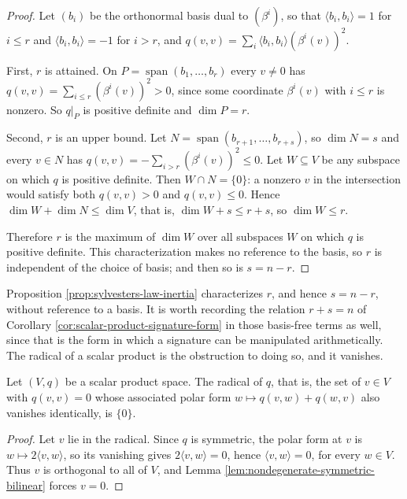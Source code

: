 \begin{proof}
\leanok
{}
Let $(b_i)$ be the orthonormal basis dual to $(\beta^i)$, so that $\langle b_i, b_i\rangle = 1$ for $i \leq r$ and $\langle b_i, b_i \rangle = -1$ for $i > r$, and $q(v,v) = \sum_i \langle b_i,b_i\rangle (\beta^i(v))^2$.

First, $r$ is attained. On $P = \operatorname{span}(b_1,\ldots,b_r)$ every $v \neq 0$ has $q(v,v) = \sum_{i \leq r} (\beta^i(v))^2 > 0$, since some coordinate $\beta^i(v)$ with $i \le r$ is nonzero. So $q|_P$ is positive definite and $\dim P = r$.

Second, $r$ is an upper bound. Let $N = \operatorname{span}(b_{r+1},\ldots,b_{r+s})$, so $\dim N = s$ and every $v \in N$ has $q(v,v) = -\sum_{i > r} (\beta^i(v))^2 \leq 0$. Let $W \subseteq V$ be any subspace on which $q$ is positive definite. Then $W \cap N = \{0\}$: a nonzero $v$ in the intersection would satisfy both $q(v,v) > 0$ and $q(v,v) \leq 0$. Hence $\dim W + \dim N \leq \dim V$, that is, $\dim W + s \leq r + s$, so $\dim W \leq r$.

Therefore $r$ is the maximum of $\dim W$ over all subspaces $W$ on which $q$ is positive definite. This characterization makes no reference to the basis, so $r$ is independent of the choice of basis; and then so is $s = n - r$.
\end{proof}

Proposition \ref{prop:sylvesters-law-inertia} characterizes $r$, and hence $s = n - r$, without reference to a basis. It is worth recording the relation $r + s = n$ of Corollary \ref{cor:scalar-product-signature-form} in those basis-free terms as well, since that is the form in which a signature can be manipulated arithmetically. The radical of a scalar product is the obstruction to doing so, and it vanishes.

\begin{lemma}
\label{lem:radical-scalar-product-trivial}
\leanok
{}
Let $(V,q)$ be a scalar product space. The radical of $q$, that is, the set of $v \in V$ with $q(v,v) = 0$ whose associated polar form $w \mapsto q(v,w) + q(w,v)$ also vanishes identically, is $\{0\}$.
\end{lemma}

\begin{proof}
\leanok
{}
Let $v$ lie in the radical. Since $q$ is symmetric, the polar form at $v$ is $w \mapsto 2\langle v,w\rangle$, so its vanishing gives $2\langle v,w\rangle = 0$, hence $\langle v,w \rangle = 0$, for every $w \in V$. Thus $v$ is orthogonal to all of $V$, and Lemma \ref{lem:nondegenerate-symmetric-bilinear} forces $v = 0$.
\end{proof}

